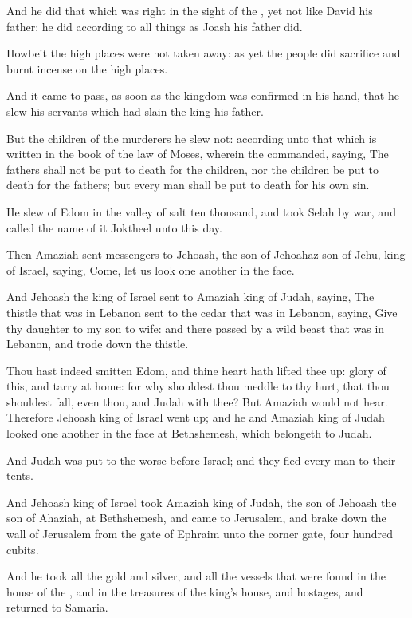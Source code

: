 \Verse And he did that which was right in the sight of the \LORD, yet not like David his father: he did according to all things as Joash his father did.

\Verse Howbeit the high places were not taken away: as yet the people did sacrifice and burnt incense on the high places.

\Verse And it came to pass, as soon as the kingdom was confirmed in his hand, that he slew his servants which had slain the king his father.

\Verse But the children of the murderers he slew not: according unto that which is written in the book of the law of Moses, wherein the \LORD commanded, saying, The fathers shall not be put to death for the children, nor the children be put to death for the fathers; but every man shall be put to death for his own sin.

\Verse He slew of Edom in the valley of salt ten thousand, and took Selah by war, and called the name of it Joktheel unto this day.

\Verse Then Amaziah sent messengers to Jehoash, the son of Jehoahaz son of Jehu, king of Israel, saying, Come, let us look one another in the face.

\Verse And Jehoash the king of Israel sent to Amaziah king of Judah, saying, The thistle that was in Lebanon sent to the cedar that was in Lebanon, saying, Give thy daughter to my son to wife: and there passed by a wild beast that was in Lebanon, and trode down the thistle.

\Verse Thou hast indeed smitten Edom, and thine heart hath lifted thee up: glory of this, and tarry at home: for why shouldest thou meddle to thy hurt, that thou shouldest fall, even thou, and Judah with thee?  \Verse But Amaziah would not hear. Therefore Jehoash king of Israel went up; and he and Amaziah king of Judah looked one another in the face at Bethshemesh, which belongeth to Judah.

\Verse And Judah was put to the worse before Israel; and they fled every man to their tents.

\Verse And Jehoash king of Israel took Amaziah king of Judah, the son of Jehoash the son of Ahaziah, at Bethshemesh, and came to Jerusalem, and brake down the wall of Jerusalem from the gate of Ephraim unto the corner gate, four hundred cubits.

\Verse And he took all the gold and silver, and all the vessels that were found in the house of the \LORD, and in the treasures of the king's house, and hostages, and returned to Samaria.


